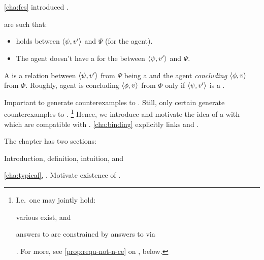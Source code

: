 \chapter{}
\label{cha:requs}

\begin{note}
  \autoref{cha:fcs} introduced .

   are such that:
  \begin{itemize}
  \item
    \ros{} holds between \(\langle \psi, v' \rangle\) and \(\Psi\) (for the agent).
  \item
    The agent doesn't have a \wit{} for the \ros{} between \(\langle \psi, v' \rangle\) and \(\Psi\).
  \end{itemize}

  A \requ{} is a relation between \(\langle \psi, v' \rangle\) from \(\Psi\) being a \fc{} and the agent \emph{concluding} \(\langle \phi, v \rangle\) from \(\Phi\).
  Roughly, agent is concluding \(\langle \phi, v \rangle\) from \(\Phi\) only if \(\langle \psi, v' \rangle\) is a \fc{}.
\end{note}

\begin{note}
  Important to generate counterexamples to \issueConstraint{}.
  Still, only certain  generate counterexamples to \issueConstraint{}.%
  \footnote{
    I.e.\ one may jointly hold:
    \begin{enumerate*}[label=(\alph*)]
    \item
      various  exist, and
    \item
      answers to \qWhyV{} are constrained by answers to \qHowV{} via \issueConstraint{}
    \end{enumerate*}%
    .
    For more, see \autoref{prop:requ-not-n-ce} on , below.
  }
  Hence, we introduce and motivate the idea of a  with  which are compatible with \issueConstraint{}.
  \autoref{cha:binding} explicitly links  and \issueConstraint{}.
\end{note}

\begin{note}
  The chapter has two sections:
  \begin{TOCEnum}
  \item

    Introduction, definition, intuition, and 
  \item

    \autoref{cha:typical}, \tC{}.
    Motivate existence of .
  \end{TOCEnum}
\end{note}


